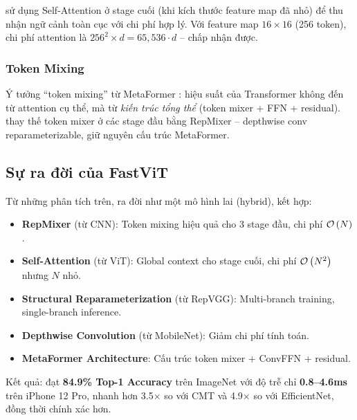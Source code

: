 \fastvit{} sử dụng Self-Attention ở stage cuối (khi kích thước feature map đã nhỏ) để thu nhận ngữ cảnh toàn cục với chi phí hợp lý. Với feature map $16 \times 16$ (256 token), chi phí attention là $256^2 \times d = 65{,}536 \cdot d$ -- chấp nhận được.

\subsubsection*{Token Mixing}

Ý tưởng ``token mixing'' từ MetaFormer \cite{metaformer2022}: hiệu suất của Transformer không đến từ attention cụ thể, mà từ \textit{kiến trúc tổng thể} (token mixer + FFN + residual). \fastvit{} thay thế token mixer ở các stage đầu bằng RepMixer -- depthwise conv reparameterizable, giữ nguyên cấu trúc MetaFormer.

\subsection{Sự ra đời của FastViT}

Từ những phân tích trên, \fastvit{} \cite{fastvit2023} ra đời như một mô hình lai (hybrid), kết hợp:

\begin{itemize}
    \item \textbf{RepMixer} (từ CNN): Token mixing hiệu quả cho 3 stage đầu, chi phí $\mathcal{O}\left(N\right)$.
    \item \textbf{Self-Attention} (từ ViT): Global context cho stage cuối, chi phí $\mathcal{O}\left(N^2\right)$ nhưng $N$ nhỏ.
    \item \textbf{Structural Reparameterization} (từ RepVGG): Multi-branch training, single-branch inference.
    \item \textbf{Depthwise Convolution} (từ MobileNet): Giảm chi phí tính toán.
    \item \textbf{MetaFormer Architecture}: Cấu trúc token mixer + ConvFFN + residual.
\end{itemize}

Kết quả: \fastvit{} đạt \textbf{84.9\% Top-1 Accuracy} trên ImageNet với độ trễ chỉ \textbf{0.8--4.6ms} trên iPhone 12 Pro, nhanh hơn 3.5$\times$ so với CMT và 4.9$\times$ so với EfficientNet, đồng thời chính xác hơn.
